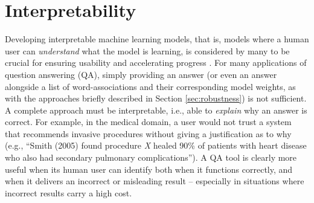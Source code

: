 \section{Interpretability}
\label{sec:interpretability}





Developing interpretable machine learning models, that is, models where a human user can \emph{understand} what the model is learning, is considered by many to be crucial for ensuring usability and accelerating progress \citep{craven1996extracting,Kim2015MindTG, letham2015interpretable, Ribeiro2016WhySI}.  
For many applications of question answering (QA), simply providing an answer (or even an answer alongside a list of word-associations and their corresponding model weights, as with the approaches briefly described in Section \ref{sec:robustness}) is not sufficient. A complete approach must be interpretable, i.e., able to {\em explain} why an answer is correct. 
For example, in the medical domain, a user would not trust a system that recommends invasive procedures without giving a justification as to why (e.g., ``Smith (2005) found procedure \emph{X} healed 90\% of patients with heart disease who also had secondary pulmonary complications'').  A QA tool is clearly more useful when its human user can identify both when it functions correctly, and when it delivers an incorrect or misleading result -- especially in situations where incorrect results carry a high cost.  

